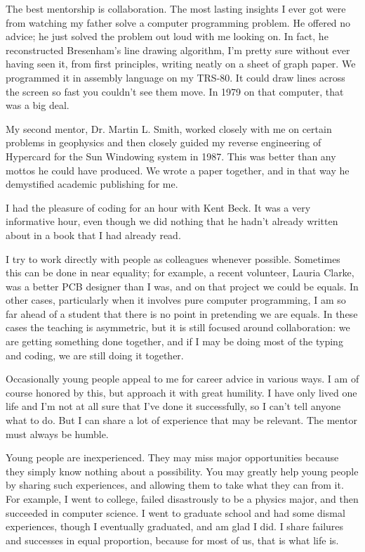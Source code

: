 \documentclass[
	fontsize=10pt, %
	twoside=false, %
	secnumdepth=1, %
]{kaobook}
\begin{document}
The best mentorship is collaboration. The most lasting insights I ever got were from watching my father solve a computer programming problem. He offered no advice; he just solved the problem out loud with me looking on. In fact, he reconstructed Bresenham’s line drawing algorithm, I’m pretty sure without ever having seen it, from first principles, writing neatly on a sheet of graph paper. We programmed it in assembly language on my TRS-80. It could draw lines across the screen so fast you couldn’t see them move. In 1979 on that computer, that was a big deal.

My second mentor, Dr. Martin L. Smith, worked closely with me on certain problems in geophysics and then closely guided my reverse engineering of Hypercard for the Sun Windowing system in 1987. This was better than any mottos he could have produced. We wrote a paper together, and in that way he demystified academic publishing for me.

I had the pleasure of coding for an hour with Kent Beck. It was a very informative hour, even though we did nothing that he hadn’t already written about in a book that I had already read.

I try to work directly with people as colleagues whenever possible. Sometimes this can be done in near equality; for example, a recent volunteer, Lauria Clarke, was a better PCB designer than I was, and on that project we could be equals. In other cases, particularly when it involves pure computer programming, I am so far ahead of a student that there is no point in pretending we are equals. In these cases the teaching is asymmetric, but it is still focused around collaboration: we are getting something done together, and if I may be doing most of the typing and coding, we are still doing it together.

Occasionally young people appeal to me for career advice in various ways. I am of course honored by this, but approach it with great humility. I have only lived one life and I’m not at all sure that I’ve done it successfully, so I can’t tell anyone what to do. But I can share a lot of experience that may be relevant. The mentor must always be humble.

Young people are inexperienced. They may miss major opportunities because they simply know nothing about a possibility. You may greatly help young people by sharing such experiences, and allowing them to take what they can from it. For example, I went to college, failed disastrously to be a physics major, and then succeeded in computer science. I went to graduate school and had some dismal experiences, though I eventually graduated, and am glad I did. I share failures and successes in equal proportion, because for most of us, that is what life is.
\end{document}

